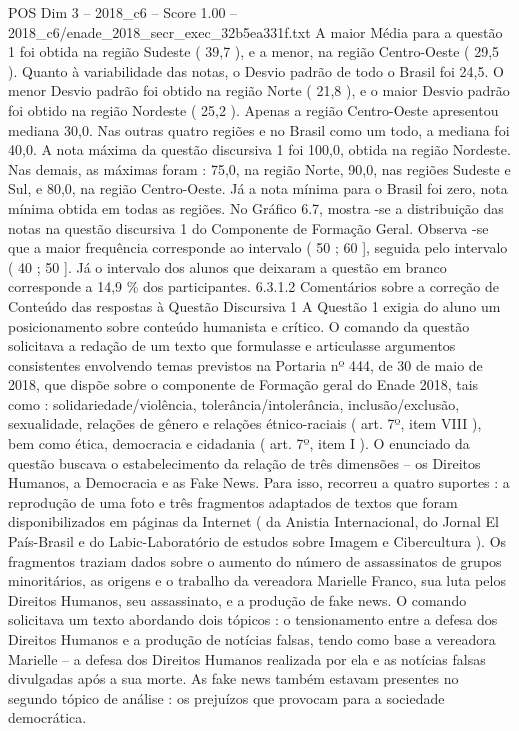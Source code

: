 \begin{textsample}{POS Dim 3 – 2018\_c6 – Score 1.00 – 2018\_c6/enade\_2018\_secr\_exec\_32b5ea331f.txt}
A maior Média para a questão 1 foi obtida na região Sudeste ( 39,7 ), e a menor, na região Centro-Oeste ( 29,5 ).
Quanto à variabilidade das notas, o Desvio padrão de todo o Brasil foi 24,5.
O menor Desvio padrão foi obtido na região Norte ( 21,8 ), e o maior Desvio padrão foi obtido na região Nordeste ( 25,2 ).
Apenas a região Centro-Oeste apresentou mediana 30,0.
Nas outras quatro regiões e no Brasil como um todo, a mediana foi 40,0.
A nota máxima da questão discursiva 1 foi 100,0, obtida na região Nordeste.
Nas demais, as máximas foram : 75,0, na região Norte, 90,0, nas regiões Sudeste e Sul, e 80,0, na região Centro-Oeste.
Já a nota mínima para o Brasil foi zero, nota mínima obtida em todas as regiões.
No Gráfico 6.7, mostra -se a distribuição das notas na questão discursiva 1 do Componente de Formação Geral.
Observa -se que a maior frequência corresponde ao intervalo ( 50 ; 60 ], seguida pelo intervalo ( 40 ; 50 ].
Já o intervalo dos alunos que deixaram a questão em branco corresponde a 14,9 \% dos participantes. 6.3.1.2 Comentários sobre a correção de Conteúdo das respostas à Questão Discursiva 1 A Questão 1 exigia do aluno um posicionamento sobre conteúdo humanista e crítico.
O comando da questão solicitava a redação de um texto que formulasse e articulasse argumentos consistentes envolvendo temas previstos na Portaria nº 444, de 30 de maio de 2018, que dispõe sobre o componente de Formação geral do Enade 2018, tais como : solidariedade/violência, tolerância/intolerância, inclusão/exclusão, sexualidade, relações de gênero e relações étnico-raciais ( art. 7º, item VIII ), bem como ética, democracia e cidadania ( art. 7º, item I ).
O enunciado da questão buscava o estabelecimento da relação de três dimensões – os Direitos Humanos, a Democracia e as Fake News.
Para isso, recorreu a quatro suportes : a reprodução de uma foto e três fragmentos adaptados de textos que foram disponibilizados em páginas da Internet ( da Anistia Internacional, do Jornal El País-Brasil e do Labic-Laboratório de estudos sobre Imagem e Cibercultura ).
Os fragmentos traziam dados sobre o aumento do número de assassinatos de grupos minoritários, as origens e o trabalho da vereadora Marielle Franco, sua luta pelos Direitos Humanos, seu assassinato, e a produção de fake news.
O comando solicitava um texto abordando dois tópicos : o tensionamento entre a defesa dos Direitos Humanos e a produção de notícias falsas, tendo como base a vereadora Marielle – a defesa dos Direitos Humanos realizada por ela e as notícias falsas divulgadas após a sua morte.
As fake news também estavam presentes no segundo tópico de análise : os prejuízos que provocam para a sociedade democrática.

\end{textsample}
